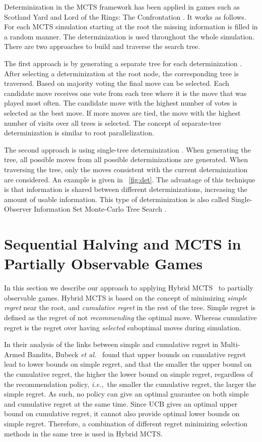 \documentclass[a4paper]{llncs}
\newcommand{\ie}{{\it i.e.,}~}
\begin{document}
Determinization in the MCTS framework has been applied in games such as Scotland Yard \cite{nijssen12tciaig} and Lord of the Rings: The Confrontation \cite{cowling2012}. It works as follows. For each MCTS simulation starting at the root the missing information  is filled in a  random manner. The determinization is used throughout the whole simulation. There are two approaches to build and traverse the search tree. 

The first approach is by generating a separate tree for each determinization \cite{cowling2012}. After selecting a determinization at the root node, the corresponding tree is traversed. Based on majority voting \cite{nijssen12tciaig} the final move can be selected. Each candidate move receives one vote from each tree where it is the move that was played most often. The candidate move with the highest number of votes is selected
as the best move. If more moves are tied, the move with the highest number of visits
over all trees is selected. The concept of separate-tree determinization is similar to root parallelization.

The second approach is using single-tree determinization \cite{ciancarini10,cowling2012,nijssen12tciaig}. When generating the tree, all possible moves from all possible determinizations are generated. When traversing the tree, only the moves consistent with the current determinization are considered. An example is given in \figurename~\ref{fig:det}. The advantage of this technique is that information is shared between different determinizations, increasing the amount of usable information. This type of determinization is  also called Single-Observer Information Set Monte-Carlo Tree Search \cite{cowling2012}.

\section{Sequential Halving and MCTS in Partially Observable Games}
\label{sec:h-mcts}

In this section we describe our approach to applying Hybrid MCTS~\cite{Pepels14hmcts} to partially observable games. Hybrid MCTS is based on the concept of minimizing \emph{simple regret} near the root, and \emph{cumulative regret} in the rest of the tree. Simple regret is defined as the regret of not \emph{recommending} the optimal move. Whereas cumulative regret is the regret over having \emph{selected} suboptimal moves during simulation.

In their analysis of the links between simple and cumulative regret in Multi-Armed Bandits, Bubeck \emph{et al.}~\cite{Bubeck11Pure} found that upper bounds on cumulative regret lead to lower bounds on simple regret, and that the smaller the upper bound on the cumulative regret, the higher the lower bound on simple regret, regardless of the recommendation policy, \ie the smaller the cumulative regret, the larger the simple regret. As such, no policy can give an optimal guarantee on both simple and cumulative regret at the same time. Since UCB gives an optimal upper bound on cumulative regret, it cannot also provide optimal lower bounds on simple regret. Therefore, a combination of different regret minimizing selection methods in the same tree is used in Hybrid MCTS.
\end{document}
